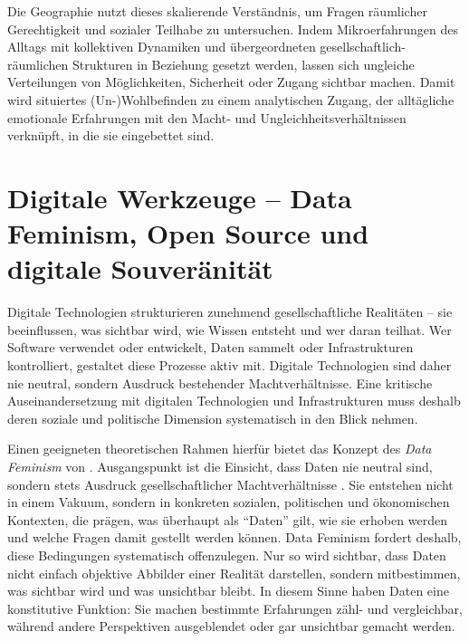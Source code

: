 Die Geographie nutzt dieses skalierende Verständnis, um Fragen räumlicher Gerechtigkeit und sozialer Teilhabe zu untersuchen. Indem Mikroerfahrungen des Alltags mit kollektiven Dynamiken und übergeordneten gesellschaftlich-räumlichen Strukturen in Beziehung gesetzt werden, lassen sich ungleiche Verteilungen von Möglichkeiten, Sicherheit oder Zugang sichtbar machen. Damit wird situiertes (Un\nobreakdash-)Wohlbefinden zu einem analytischen Zugang, der alltägliche emotionale Erfahrungen mit den Macht- und Ungleichheitsverhältnissen verknüpft, in die sie eingebettet sind.

\section{Digitale Werkzeuge -- Data Feminism, Open Source und digitale Souveränität}
\label{sec:datafeminism}

Digitale Technologien strukturieren zunehmend gesellschaftliche Realitäten -- sie beeinflussen, was sichtbar wird, wie Wissen entsteht und wer daran teilhat. Wer Software verwendet oder entwickelt, Daten sammelt oder Infrastrukturen kontrolliert, gestaltet diese Prozesse aktiv mit. Digitale Technologien sind daher nie neutral, sondern Ausdruck bestehender Machtverhältnisse. Eine kritische Auseinandersetzung mit digitalen Technologien und Infrastrukturen muss deshalb deren soziale und politische Dimension systematisch in den Blick nehmen.

Einen geeigneten theoretischen Rahmen hierfür bietet das Konzept des \textit{Data Feminism} von \textcite{dignazioDataFeminism2020}. Ausgangspunkt ist die Einsicht, dass Daten nie neutral sind, sondern stets Ausdruck gesellschaftlicher Machtverhältnisse \parencite[\gls{vgl}][\gls{s}~53ff.]{dignazioDataFeminism2020}. Sie entstehen nicht in einem Vakuum, sondern in konkreten sozialen, politischen und ökonomischen Kontexten, die prägen, was überhaupt als \enquote{Daten} gilt, wie sie erhoben werden und welche Fragen damit gestellt werden können. Data Feminism fordert deshalb, diese Bedingungen systematisch offenzulegen. Nur so wird sichtbar, dass Daten nicht einfach objektive Abbilder einer Realität darstellen, sondern mitbestimmen, was sichtbar wird und was unsichtbar bleibt. In diesem Sinne haben Daten eine konstitutive Funktion: Sie machen bestimmte Erfahrungen zähl- und vergleichbar, während andere Perspektiven ausgeblendet oder gar unsichtbar gemacht werden.

